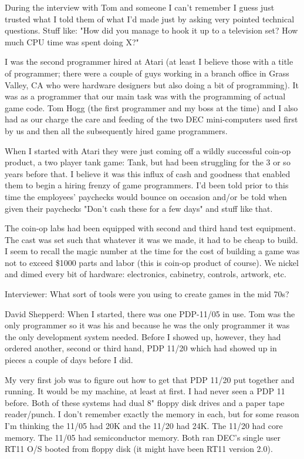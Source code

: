 During the interview with Tom and someone I can’t remember I guess just trusted what I told them of what I'd made just by asking very pointed technical questions. Stuff like: "How did you manage to hook it up to a television set? How much CPU time was spent doing X?"

I was the second programmer hired at Atari (at least I believe those with a title of programmer; there were a couple of guys working in a branch office in Grass Valley, CA who were hardware designers but also doing a bit of programming). It was as a programmer that our main task was with the programming of actual game code. Tom Hogg (the first programmer and my boss at the time) and I also had as our charge the care and feeding of the two DEC mini-computers used first by us and then all the subsequently hired game programmers.

When I started with Atari they were just coming off a wildly successful coin-op product, a two player tank game: Tank, but had been struggling for the 3 or so years before that. I believe it was this influx of cash and goodness that enabled them to begin a hiring frenzy of game programmers. I'd been told prior to this time the employees' paychecks would bounce on occasion and/or be told when given their paychecks "Don't cash these for a few days" and stuff like that. 

The coin-op labs had been equipped with second and third hand test equipment. The cast was set such that whatever it was we made, it had to be cheap to build. I seem to recall the magic number at the time for the cost of building a game was not to exceed \$1000 parts and labor (this is coin-op product of course). We nickel and dimed every bit of hardware: electronics, cabinetry, controls, artwork, etc. 

\textcolor{interviewer}{Interviewer:} What sort of tools were you using to create games in the mid 70s?

\textcolor{interviewee}{David Shepperd:} When I started, there was one PDP-11/05 in use. Tom was the only programmer so it was his and because he was the only programmer it was the only development system needed. Before I showed up, however, they had ordered another, second or third hand, PDP 11/20 which had showed up in pieces a couple of days before I did. 

My very first job was to figure out how to get that PDP 11/20 put together and running. It would be my machine, at least at first. I had never seen a PDP 11 before. Both of these systems had dual 8" floppy disk drives and a paper tape reader/punch. I don't remember exactly the memory in each, but for some reason I'm thinking the 11/05 had 20K and the 11/20 had 24K. The 11/20 had core memory. The 11/05 had semiconductor memory. Both ran DEC's single user RT11 O/S booted from floppy disk (it might have been RT11 version 2.0). 

